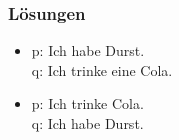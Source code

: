 \begin{frame}[shrink=20]
\frametitle{Lösungen}

\begin{table}

\begin{minipage}{0.4\textwidth}
\centering
\begin{itemize}
\item[] {\small p: Ich habe Durst.\\
q: Ich trinke eine Cola.}
\end{itemize}
\end{minipage}
%	
\begin{minipage}{0.5\textwidth}
\centering
\begin{itemize}
\item[] {\small
p: Ich trinke Cola.\\
q: Ich habe Durst.}
\end{itemize}
\end{minipage}

\vspace{1em}


\end{table}
\end{frame}
